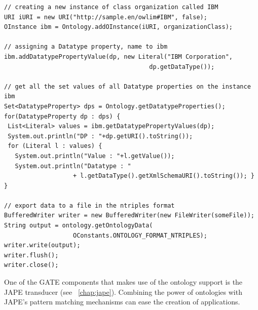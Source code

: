 {\begin{lstlisting}
// creating a new instance of class organization called IBM
URI iURI = new URI("http://sample.en/owlim#IBM", false);
OInstance ibm = Ontology.addOInstance(iURI, organizationClass);

// assigning a Datatype property, name to ibm
ibm.addDatatypePropertyValue(dp, new Literal("IBM Corporation", 
                                        dp.getDataType());

// get all the set values of all Datatype properties on the instance ibm
Set<DatatypeProperty> dps = Ontology.getDatatypeProperties();
for(DatatypeProperty dp : dps) {
 List<Literal> values = ibm.getDatatypePropertyValues(dp);
 System.out.println("DP : "+dp.getURI().toString());
 for (Literal l : values) {
   System.out.println("Value : "+l.getValue());
   System.out.println("Datatype : " 
                   + l.getDataType().getXmlSchemaURI().toString()); }
}

// export data to a file in the ntriples format
BufferedWriter writer = new BufferedWriter(new FileWriter(someFile));
String output = ontology.getOntologyData(
                   OConstants.ONTOLOGY_FORMAT_NTRIPLES);
writer.write(output);
writer.flush();
writer.close();
\end{lstlisting}


One of the GATE components that makes use of the ontology support is the JAPE
transducer (see \Chapthing~\ref{chap:jape}). Combining the power of ontologies
with JAPE's pattern matching mechanisms can ease the creation of applications.

}
